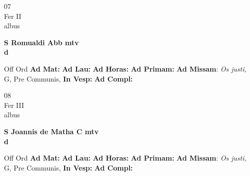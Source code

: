 \documentclass[10pt, openany]{book}
\begin{document}
        \begin{center}
            \begin{minipage}{3.5in}
                \vspace{2em}
                \begin{minipage}{0.5in}
                    {\Huge 07} \\
                    {\normalsize Fer II} \\
                    {\normalsize albus}
                \end{minipage}
                \begin{minipage}{3.0in}
                    \textbf{ \large S Romualdi Abb mtv \\
                    \textnormal{\normalsize d}} \\ 
                \end{minipage}
                \begin{justify}Off Ord
                    \textbf{Ad Mat: }
                    \textbf{Ad Lau: }
                    \textbf{Ad Horas: }
                    \textbf{Ad Primam: }\textbf{Ad Missam}: \textit{Os justi,} G, Pre Communis,  
                    \textbf{In Vesp: }
                    \textbf{Ad Compl: }
                \end{justify}
            \end{minipage}
        \end{center}
    
        \begin{center}
            \begin{minipage}{3.5in}
                \vspace{2em}
                \begin{minipage}{0.5in}
                    {\Huge 08} \\
                    {\normalsize Fer III} \\
                    {\normalsize albus}
                \end{minipage}
                \begin{minipage}{3.0in}
                    \textbf{ \large S Joannis de Matha C mtv \\
                    \textnormal{\normalsize d}} \\ 
                \end{minipage}
                \begin{justify}Off Ord
                    \textbf{Ad Mat: }
                    \textbf{Ad Lau: }
                    \textbf{Ad Horas: }
                    \textbf{Ad Primam: }\textbf{Ad Missam}: \textit{Os justi,} G, Pre Communis,  
                    \textbf{In Vesp: }
                    \textbf{Ad Compl: }
                \end{justify}
            \end{minipage}
        \end{center}
    
\end{document}

